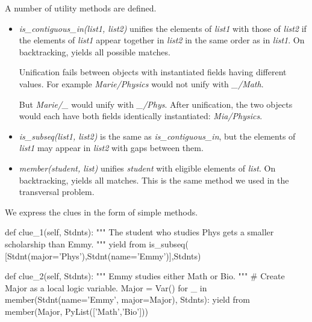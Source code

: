 A number of utility methods are defined.
\begin{itemize}
    \item \textit{is\_contiguous\_in(list1, list2)} unifies the elements of \textit{list1} with those of \textit{list2} if the elements of \textit{list1} appear together in \textit{list2} in the same order as in \textit{list1}. On backtracking, yields all possible matches. 
    
    \smallv
    Unification fails between objects with instantiated fields having different values. For example \textit{Marie/Physics} would not unify with \textit{\_/Math}.
    
    \smallv
    But \textit{Marie/\_} would unify with \textit{\_/Phys}. After unification, the two objects would each have both fields identically instantiated: \textit{Mia/Physics}.
    
    \item \textit{is\_subseq(list1, list2)} is the same as \textit{is\_contiguous\_in}, but the elements of \textit{list1} may appear in \textit{list2} with gaps between them.
    \item \textit{member(student, list)} unifies \textit{student} with eligible elements of \textit{list}. On backtracking, yields all matches. This is the same method we used in the transversal problem.
\end{itemize}

We express the clues in the form of simple methods. 
\begin{center}
\begin{minipage}[c]{0.45\textwidth}
\begin{python1}
def clue_1(self, Stdnts):
  """ The student who studies Phys gets a 
      smaller scholarship than Emmy. """
  yield from is_subseq(
    [Stdnt(major='Phys'),Stdnt(name='Emmy')],Stdnts)
\end{python1}
\end{minipage}
\end{center}

\begin{center}
\begin{minipage}[c]{0.45\textwidth}
\begin{python1}
def clue_2(self, Stdnts):
  """ Emmy studies either Math or Bio. """
  # Create Major as a local logic variable.
  Major = Var()
  for _ in member(Stdnt(name='Emmy', major=Major), 
                  Stdnts):
    yield from member(Major, PyList(['Math','Bio']))
\end{python1}
\end{minipage}
\end{center}

